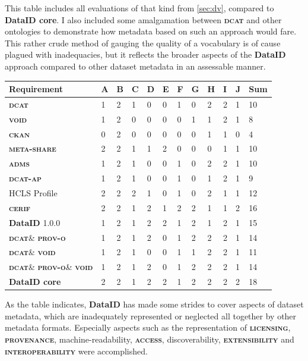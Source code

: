 \documentclass[a4paper,english,twoside,BCOR1.5cm,headsepline,DIV12,appendixprefix,final,12pt]{scrbook}
\newcommand{\provenance}{{\ttfamily\scshape\bfseries provenance}\xspace}
\newcommand{\licensing}{{\ttfamily\scshape\bfseries licensing}\xspace}
\newcommand{\access}{{\ttfamily\scshape\bfseries access}\xspace}
\newcommand{\extensibility}{{\ttfamily\scshape\bfseries extensibility}\xspace}
\newcommand{\interoperability}{{\ttfamily\scshape\bfseries interoperability}\xspace}
\newcommand{\dataid}{{\ttfamily\bfseries DataID}\xspace}
\newcommand{\core}{{\ttfamily\bfseries DataID core}\xspace}
\newcommand{\prov}{{\scshape\bfseries prov-o}\xspace}
\newcommand{\void}{{\scshape\bfseries void}\xspace}
\newcommand{\ckan}{{\scshape\bfseries ckan}\xspace}
\newcommand{\dcat}{{\scshape\bfseries dcat}\xspace}
\newcommand{\dcatap}{{\scshape\bfseries dcat-ap}\xspace}
\newcommand{\adms}{{\scshape\bfseries adms}\xspace}
\newcommand{\cerif}{{\scshape\bfseries cerif}\xspace}
\newcommand{\metashare}{{\scshape\bfseries meta-share}\xspace}
\begin{document}
This table includes all evaluations of that kind from \cref{sec:dv}, compared to \core. I also included some amalgamation between \dcat and other ontologies to demonstrate how metadata based on such an approach would fare.
This rather crude method of gauging the quality of a vocabulary is of cause plagued with inadequacies, but it reflects the broader aspects of the \dataid approach compared to other dataset metadata in an assessable manner.
\begin{table}[!htbp]
    \centering
    \begin{tabular}{|l|l|l|l|l|l|l|l|l|l|l|l|}
        \hline
        Requirement & A & B & C & D & E & F & G & H & I & J & Sum \\
        \hline
        \dcat & 1 & 2 & 1 & 0 & 0 & 1 & 0 & 2 & 2 & 1 & 10 \\
        \void & 1 & 2 & 0 & 0 & 0 & 0 & 1 & 1 & 2 & 1 & 8 \\
        \ckan & 0 & 2 & 0 & 0 & 0 & 0 & 0 & 1 & 1 & 0 & 4 \\
        \metashare & 2 & 2 & 1 & 1 & 2 & 0 & 0 & 0 & 1 & 1 & 10 \\
        \adms & 1 & 2 & 1 & 0 & 0 & 1 & 0 & 2 & 2 & 1 & 10 \\
        \dcatap & 1 & 2 & 1 & 0 & 0 & 1 & 0 & 1 & 2 & 1 & 9 \\
        HCLS Profile & 2 & 2 & 2 & 1 & 0 & 1 & 0 & 2 & 1 & 1 & 12 \\
        \cerif & 2 & 2 & 1 & 2 & 1 & 2 & 2 & 1 & 1 & 2 & 16 \\
        \dataid 1.0.0 & 1 & 2 & 1 & 2 & 2 & 1 & 2 & 1 & 2 & 1 & 15 \\
        \hline
        \dcat \& \prov & 1 & 2 & 1 & 2 & 0 & 1 & 2 & 2 & 2 & 1 & 14 \\ 
        \dcat \& \void & 1 & 2 & 1 & 0 & 0 & 1 & 1 & 2 & 2 & 1 & 11 \\
        \dcat \& \prov \& \void & 1 & 2 & 1 & 2 & 0 & 1 & 2 & 2 & 2 & 1 & 14 \\
        \hline
        \core & 2 & 2 & 1 & 2 & 2 & 1 & 2 & 2 & 2 & 2 & 18 \\
        \hline
    \end{tabular}
    \label{tab:evaldcat}
\end{table}

As the table indicates, \dataid has made some strides to cover aspects of dataset metadata, which are inadequately represented or neglected all together by other metadata formats. Especially aspects such as the representation of \licensing, \provenance, machine-readability, \access, discoverability, \extensibility and \interoperability were accomplished.
\end{document}
